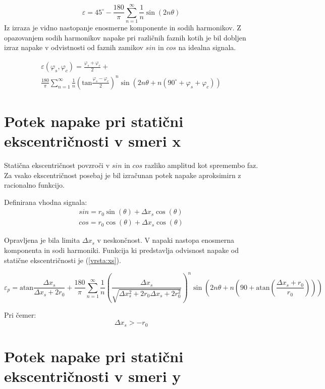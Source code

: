 \begin{equation}
\label{equ:lim_fis_vrsta}
\varepsilon = 45^\circ - \frac{180}{\pi}\sum_{n=1}^{\infty}\frac{1}{n} \sin (2n \theta)
\end{equation} 
Iz  izraza je vidno nastopanje enosmerne komponente in sodih harmonikov. Z opazovanjem sodih harmonikov napake pri različnih faznih kotih je bil dobljen izraz napake v odvistnosti od faznih zamikov $sin$ in $cos$ na idealna signala.

\begin{multline}
\label{equ:fis_err}
\varepsilon(\varphi_{s},\varphi_{c}) = \frac{\varphi_{s}+\varphi_{c}}{2}+\\ \frac{180}{\pi}\sum_{n=1}^{\infty}\frac{1}{n} (\mathrm{tan}\frac{\varphi_{s}-\varphi_{c}}{2})^n \sin (2n \theta+n(90^\circ +\varphi_{s}+\varphi_{c}))
\end{multline}


\newpage
\section{Potek napake pri statični ekscentričnosti v smeri x}

Statična ekscentričnost povzroči v $sin$ in $cos$ razliko amplitud kot spremembo faz. Za vsako ekscentričnost posebaj je bil izračunan potek napake aproksimirn z racionalno funkcijo.

Definirana vhodna signala:
\begin{eqnarray}
\label{xs_analit}
sin = r_0 \sin(\theta) + \Delta x_s \cos(\theta) \\
cos = r_0 \cos(\theta) + \Delta x_s \cos(\theta)
\end{eqnarray}

Opravljena je bila limita $\Delta x_s$ v neskončnost. V napaki nastopa enosmerna komponenta in sodi harmoniki. Funkcija ki predstavlja odvisnost napake od statične ekscentričnosti je (\ref{vrsta:xs}).

 \begin{equation}
 \label{vrsta:xs}
 \varepsilon_p = \mathrm{atan}\frac{\Delta x _s}{\Delta x _s+2r_0}+\frac{180}{\pi} \sum_{n=1}^{\infty}\frac{1}{n} (\frac{\Delta x _s}{\sqrt{\Delta x _s^2+2 r_0 \Delta x _s+2r_0^2}})^n \sin (2n \theta+n (90+ \mathrm{ atan}(\frac{\Delta x _s+r_0}{r_0})))
 \end{equation}
 
 Pri čemer:
 $$\Delta x_s > -r_0$$

 \section{Potek napake pri statični ekscentričnosti v smeri y}
 
